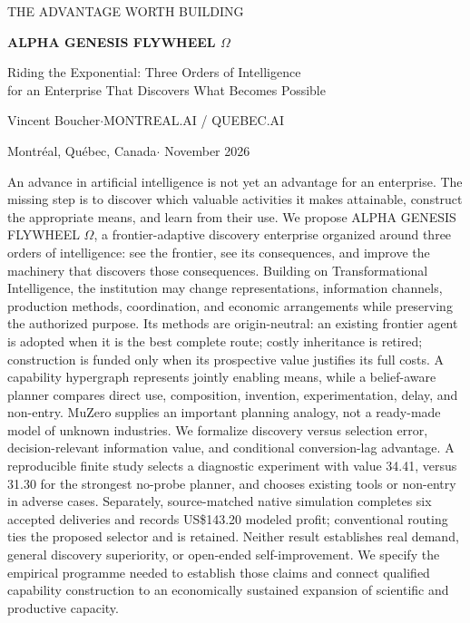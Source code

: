 \documentclass[11pt,letterpaper]{article}
\theoremstyle{remark}\newtheorem{remark}{Remark}[section]
\newcommand{\smallhead}[1]{\par\smallskip{\sffamily\bfseries\color{Gold}#1}\par\smallskip}
\begin{document}
\setcounter{page}{1}

\begin{center}
{\sffamily\small\color{Gold}THE ADVANTAGE WORTH BUILDING}\par\medskip
{\LARGE\bfseries\color{Violet}ALPHA GENESIS FLYWHEEL $\Omega$}\par\medskip
{\large Riding the Exponential: Three Orders of Intelligence\\for an Enterprise That Discovers What Becomes Possible}\par\bigskip
Vincent Boucher\quad $\cdot$\quad MONTREAL.AI / QUEBEC.AI\par
{\small Montr\'{e}al, Qu\'{e}bec, Canada\quad $\cdot$ November 2026}
\end{center}
\smallhead{ABSTRACT}
An advance in artificial intelligence is not yet an advantage for an enterprise. The missing step is to discover which valuable activities it makes attainable, construct the appropriate means, and learn from their use. We propose ALPHA GENESIS FLYWHEEL $\Omega$, a frontier-adaptive discovery enterprise organized around three orders of intelligence: see the frontier, see its consequences, and improve the machinery that discovers those consequences. Building on Transformational Intelligence, the institution may change representations, information channels, production methods, coordination, and economic arrangements while preserving the authorized purpose. Its methods are origin-neutral: an existing frontier agent is adopted when it is the best complete route; costly inheritance is retired; construction is funded only when its prospective value justifies its full costs. A capability hypergraph represents jointly enabling means, while a belief-aware planner compares direct use, composition, invention, experimentation, delay, and non-entry. MuZero supplies an important planning analogy, not a ready-made model of unknown industries. We formalize discovery versus selection error, decision-relevant information value, and conditional conversion-lag advantage. A reproducible finite study selects a diagnostic experiment with value 34.41, versus 31.30 for the strongest no-probe planner, and chooses existing tools or non-entry in adverse cases. Separately, source-matched native simulation completes six accepted deliveries and records US\$143.20 modeled profit; conventional routing ties the proposed selector and is retained. Neither result establishes real demand, general discovery superiority, or open-ended self-improvement. We specify the empirical programme needed to establish those claims and connect qualified capability construction to an economically sustained expansion of scientific and productive capacity.
\end{document}
